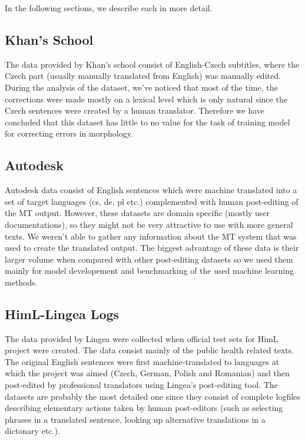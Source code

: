 In the following sections, we describe each in more detail.

\subsection{Khan's School}

The data provided by Khan's school consist of English-Czech subtitles,
where the Czech part (usually manually translated from English) was manually
edited. During the analysis of the dataset,
we've noticed that most of the time, the corrections were made
mostly on a lexical level which is only natural since the Czech sentences
were created by a human translator.
Therefore we have concluded that this dataset has little to no value
for the task of training model for correcting errors in morphology.


\subsection{Autodesk}

Autodesk data consist of English sentences which were machine translated into
a set of target languages (cs, de, pl etc.) complemented with human post-editing
of the MT output. However, these datasets are domain specific (mostly user documentations),
so they might not be very attractive to use with more general texts.
We weren't able to gather any information about the MT system that was used
to create the translated output. The biggest advantage of these data is
their larger volume when compared with other post-editing datasets so we
used them mainly for model developement and benchmarking of the used machine
learning methods.

\subsection{HimL-Lingea Logs}

The data provided by Lingea were collected when official test sets for
HimL project were
created. The data consist mainly of the public health related texts.
The original English sentences were first
machine-translated to languages at which
the project was aimed (Czech, German, Polish and Romanian)
and then post-edited by professional
translators using Lingea's post-editing tool. The datasets are probably the most
detailed one since they consist of complete logfiles
describing elementary actions taken by human post-editors (such as selecting
phrases in a translated sentence, looking up alternative translations
in a dictonary etc.).

